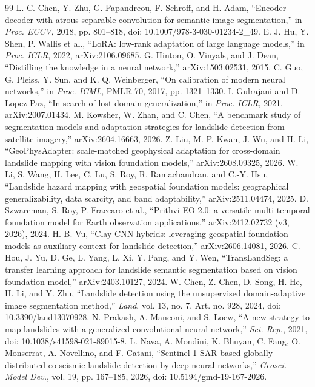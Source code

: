 \begin{thebibliography}{99}
 L.-C. Chen, Y. Zhu, G. Papandreou, F. Schroff, and H. Adam, ``Encoder-decoder with atrous separable convolution for semantic image segmentation,'' in \emph{Proc. ECCV}, 2018, pp. 801--818, doi: 10.1007/978-3-030-01234-2\_49.
 E. J. Hu, Y. Shen, P. Wallis et al., ``LoRA: low-rank adaptation of large language models,'' in \emph{Proc. ICLR}, 2022, arXiv:2106.09685.
 G. Hinton, O. Vinyals, and J. Dean, ``Distilling the knowledge in a neural network,'' arXiv:1503.02531, 2015.
 C. Guo, G. Pleiss, Y. Sun, and K. Q. Weinberger, ``On calibration of modern neural networks,'' in \emph{Proc. ICML}, PMLR 70, 2017, pp. 1321--1330.
 I. Gulrajani and D. Lopez-Paz, ``In search of lost domain generalization,'' in \emph{Proc. ICLR}, 2021, arXiv:2007.01434.
 M. Kowsher, W. Zhan, and C. Chen, ``A benchmark study of segmentation models and adaptation strategies for landslide detection from satellite imagery,'' arXiv:2604.16663, 2026.
 Z. Liu, M.-P. Kwan, J. Wu, and H. Li, ``GeoPhysAdapter: scale-matched geophysical adaptation for cross-domain landslide mapping with vision foundation models,'' arXiv:2608.09325, 2026.
 W. Li, S. Wang, H. Lee, C. Lu, S. Roy, R. Ramachandran, and C.-Y. Hsu, ``Landslide hazard mapping with geospatial foundation models: geographical generalizability, data scarcity, and band adaptability,'' arXiv:2511.04474, 2025.
 D. Szwarcman, S. Roy, P. Fraccaro et al., ``Prithvi-EO-2.0: a versatile multi-temporal foundation model for Earth observation applications,'' arXiv:2412.02732 (v3, 2026), 2024.
 H. B. Vu, ``Clay-CNN hybrids: leveraging geospatial foundation models as auxiliary context for landslide detection,'' arXiv:2606.14081, 2026.
 C. Hou, J. Yu, D. Ge, L. Yang, L. Xi, Y. Pang, and Y. Wen, ``TransLandSeg: a transfer learning approach for landslide semantic segmentation based on vision foundation model,'' arXiv:2403.10127, 2024.
 W. Chen, Z. Chen, D. Song, H. He, H. Li, and Y. Zhu, ``Landslide detection using the unsupervised domain-adaptive image segmentation method,'' \emph{Land}, vol. 13, no. 7, Art. no. 928, 2024, doi: 10.3390/land13070928.
 N. Prakash, A. Manconi, and S. Loew, ``A new strategy to map landslides with a generalized convolutional neural network,'' \emph{Sci. Rep.}, 2021, doi: 10.1038/s41598-021-89015-8.
 L. Nava, A. Mondini, K. Bhuyan, C. Fang, O. Monserrat, A. Novellino, and F. Catani, ``Sentinel-1 SAR-based globally distributed co-seismic landslide detection by deep neural networks,'' \emph{Geosci. Model Dev.}, vol. 19, pp. 167--185, 2026, doi: 10.5194/gmd-19-167-2026.

\end{thebibliography}
